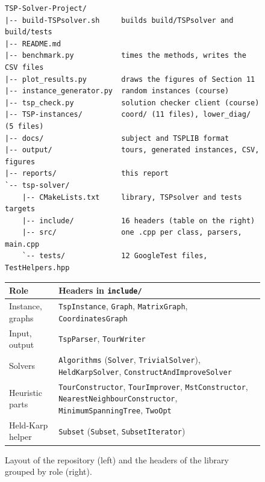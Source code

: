 \documentclass[10pt,a4paper]{article}
\begin{document}
\begin{figure}[H]
\noindent
\begin{minipage}[t]{0.57\linewidth}
\vspace{0pt}
\scriptsize
\begin{verbatim}
TSP-Solver-Project/
|-- build-TSPsolver.sh     builds build/TSPsolver and build/tests
|-- README.md
|-- benchmark.py           times the methods, writes the CSV files
|-- plot_results.py        draws the figures of Section 11
|-- instance_generator.py  random instances (course)
|-- tsp_check.py           solution checker client (course)
|-- TSP-instances/         coord/ (11 files), lower_diag/ (5 files)
|-- docs/                  subject and TSPLIB format
|-- output/                tours, generated instances, CSV, figures
|-- reports/               this report
`-- tsp-solver/
    |-- CMakeLists.txt     library, TSPsolver and tests targets
    |-- include/           16 headers (table on the right)
    |-- src/               one .cpp per class, parsers, main.cpp
    `-- tests/             12 GoogleTest files, TestHelpers.hpp
\end{verbatim}
\end{minipage}\hfill
\begin{minipage}[t]{0.41\linewidth}
\vspace{0pt}
\scriptsize
\begin{tabularx}{\linewidth}{@{}l Y@{}}
\toprule
Role & Headers in \texttt{include/} \\
\midrule
Instance, graphs & \texttt{TspInstance}, \texttt{Graph}, \texttt{MatrixGraph}, \texttt{CoordinatesGraph} \\
Input, output & \texttt{TspParser}, \texttt{TourWriter} \\
Solvers & \texttt{Algorithms} (\texttt{Solver}, \texttt{TrivialSolver}), \texttt{HeldKarpSolver}, \texttt{ConstructAndImproveSolver} \\
Heuristic parts & \texttt{TourConstructor}, \texttt{TourImprover}, \texttt{MstConstructor}, \texttt{NearestNeighbourConstructor}, \texttt{MinimumSpanningTree}, \texttt{TwoOpt} \\
Held-Karp helper & \texttt{Subset} (\texttt{Subset}, \texttt{SubsetIterator}) \\
\bottomrule
\end{tabularx}
\end{minipage}
\caption{Layout of the repository (left) and the headers of the library grouped by role (right).}
\label{fig-structure}
\end{figure}
\end{document}

